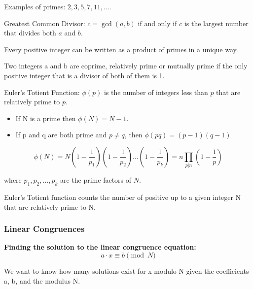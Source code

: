Examples of primes: \( 2, 3, 5, 7, 11, \dots \).

\begin{defn}
Greatest Common Divisor: \( c = \gcd(a,b) \) if and only if \( c \) is the largest number that divides
both \( a \) and \( b \).
\end{defn}

\begin{thm}
Every positive integer can be written as a product of primes in a unique way.
\end{thm}

\begin{defn}
Two integers a and b are coprime, relatively prime or mutually prime if the only positive integer that is a divisor of both of them is 1.
\end{defn}

\begin{defn}
Euler's Totient Function: \( \phi(p) \) is the number of integers less than \( p \) that are relatively prime to \( p \).
\begin{itemize}
    \item If N is a prime then \( \phi(N) = N - 1 \).
    \item If p and q are both prime and \( p \neq q \), then \( \phi(pq) = (p-1)(q-1)\)
\end{itemize}

\[ \phi(N) = N \left(1 - \frac{1}{p_1}\right) \left(1 - \frac{1}{p_2}\right) \ldots \left(1 - \frac{1}{p_k}\right) = n \prod_{p | n} (1 - \frac{1}{p})\]

where \( p_1, p_2, \ldots, p_k \) are the prime factors of \( N \).
\end{defn}

Euler's Totient function counts the number of positive up to a given integer N that are relatively prime to N. \\

\subsubsection{Linear Congruences}
\textbf{Finding the solution to the linear congruence equation:} \[ a \cdot x \equiv b \pmod{N}\]

We want to know how many solutions exist for x modulo N given the coefficients a, b, and the modulus N.

